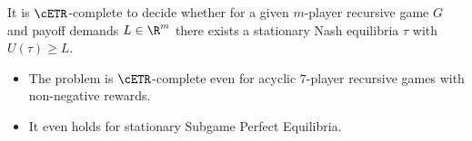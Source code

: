 \documentclass[english, aspectratio=169]{beamer}
\begin{document}
\begin{frame}
  \begin{theorem}
    It is $\cETR$-complete to decide whether for a given $m$-player
    recursive game $G$ and payoff demands $L \in \R^m$ there exists a
    stationary Nash equilibria $\tau$ with $U(\tau)\geq L$.

    \begin{itemize}
    \item The problem is $\cETR$-complete even for acyclic $7$-player recursive
      games with non-negative rewards.
    \item It even holds for stationary Subgame Perfect Equilibria.
    \end{itemize}      
    \end{theorem}
\end{frame}
\end{document}
